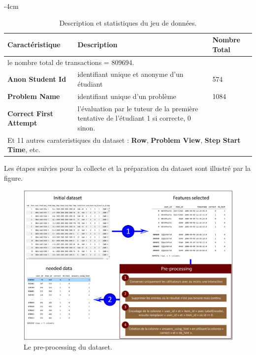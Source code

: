 \begin{table}[H]
	\centering
	\addtolength{\leftskip} {-4cm}
	\addtolength{\rightskip}{-4.5cm}
	\begin{tabular}{|m{5cm}|m{8cm}|m{4cm}|}
	\hline
	\rowcolor{blueforest}
	\color{white} \textbf{Caractéristique} & \color{white} \textbf{Description}  & \color{white} \textbf{Nombre Total}\\
	\hline
	\multicolumn{3}{|m{17cm}|}{\centering le nombre total de transactions = 809694. }\\ \hline
    \textbf{Anon Student Id} &  identifiant unique et anonyme d'un étudiant & 574 \\ \hline
    \textbf{Problem Name} &  identifiant unique d'un problème & 1084 \\ \hline 
    \textbf{Correct First Attempt} &  l'évaluation par le tuteur de la première tentative de l'étudiant 1 si correcte, 0 sinon. &  \\ \hline

    \multicolumn{3}{|m{17cm}|}{ \centering Et 11 autres carateristiques du dataset : \textbf{Row}, \textbf{Problem View}, \textbf{Step Start Time}, etc.} \\ \hline
  \end{tabular}
	\caption{Description et statistiques du jeu de données.}
	\label{dataset_features_describe}
\end{table}

\newpage
Les étapes suivies pour la collecte et la préparation du dataset sont illustré par la figure.

\begin{figure}[H]
	\begin{center}
		\includegraphics[width=\textwidth]{images/chapitre7/preprocessing_steps.png}
	\end{center}
	\caption{Le pre-processing du dataset.}
	\label{datatset_pre-processing}
\end{figure}

